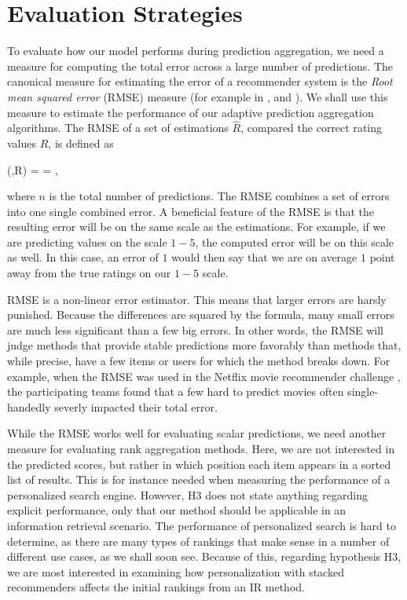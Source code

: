 \section{Evaluation Strategies}

To evaluate how our model performs during prediction aggregation, 
we need a measure for computing the total error across a large number of predictions.
The canonical measure for estimating the error of a recommender system
is the \emph{Root mean squared error} (RMSE) measure
(for example in \citet[p17]{Herlocker2004}, \citet[p13]{Adomavicius2005} and \citet[p6]{Bell2007}).
We shall use this measure to estimate the performance
of our adaptive prediction aggregation algorithms.
The RMSE of a set of estimations $\hat{R}$, 
compared the correct rating values $R$, is defined as

\begin{eqsp}
  (,R) = 
  = ,
\end{eqsp}
%
where $n$ is the total number of predictions.
The RMSE combines a set of errors into one single combined error.
A beneficial feature of the RMSE is that the resulting error 
will be on the same scale as the estimations. For example,
if we are predicting values on the scale $1-5$, the computed error
will be on this scale as well. In this case, an error of $1$
would then say that we are on average $1$ point away from the true 
ratings on our $1-5$ scale.

RMSE is a non-linear error estimator.
This means that larger errors are harsly punished.
Because the differences are squared by the formula,
many small errors are much less significant than a few big errors.
In other words, the RMSE will judge methods that provide
stable predictions more favorably
than methods that, while precise, have a few items
or users for which the method breaks down.
For example, when the RMSE was used in the Netflix movie recommender challenge
\citep{Linden2009}, the participating teams
found that a few hard to predict movies often 
single-handedly severly impacted their total error.

While the RMSE works well for evaluating scalar predictions,
we need another measure for evaluating rank aggregation methods.
Here, we are not interested in the predicted scores,
but rather in which position each item appears in a sorted list of results.
This is for instance needed when measuring the performance of a
personalized search engine.
However, H3 does not state anything regarding explicit performance,
only that our method should be applicable in an information retrieval scenario.
The performance of personalized search is hard to determine,
as there are many types of rankings that make sense in a number of different use cases,
as we shall soon see.
Because of this, regarding hypothesis H3, 
we are most interested in examining how  personalization with stacked recommenders 
affects the initial rankings from an IR method.



